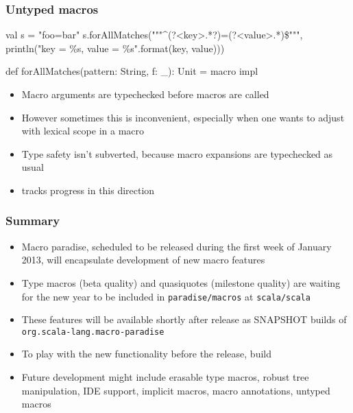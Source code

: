 \documentclass[svgnames,hyperref={bookmarks=false}]{beamer}
\begin{document}
\begin{frame}[fragile]
\frametitle{Untyped macros}
\begin{semiverbatim}
val s = "foo=bar"
s.forAllMatches("""^(?<key>.*?)=(?<value>.*)\$""",
    println("key = \%s, value = \%s".format(key, value)))

def forAllMatches(pattern: String, f: _): Unit = macro impl

\end{semiverbatim}

\begin{itemize}
\item Macro arguments are typechecked before macros are called
\item However sometimes this is inconvenient, especially when one wants to adjust with lexical scope in a macro
\item Type safety isn't subverted, because macro expansions are typechecked as usual
\item {} tracks progress in this direction
\end{itemize}
\end{frame}

\begin{frame}[fragile]
\frametitle{}

\vskip40pt
\begin{center}
\end{center}
\end{frame}

\begin{frame}[fragile]
\frametitle{Summary}

\begin{itemize}
\item Macro paradise, scheduled to be released during the first week of January 2013, will encapsulate development of new macro features
\item Type macros (beta quality) and quasiquotes (milestone quality) are waiting for the new year to be included in \texttt{paradise/macros} at \texttt{scala/scala}
\item These features will be available shortly after release as SNAPSHOT builds of \texttt{org.scala-lang.macro-paradise}
\item To play with the new functionality before the release, build 
\item Future development might include erasable type macros, robust tree manipulation, IDE support, implicit macros, macro annotations, untyped macros
\end{itemize}
\end{frame}
\end{document}
